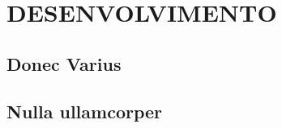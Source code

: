 \chapter{DESENVOLVIMENTO}\par
\lipsum[1]
\section{Donec Varius}
\lipsum[1-2]
\section{Nulla ullamcorper}
\lipsum[1-2]